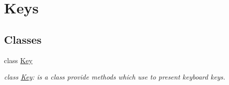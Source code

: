 \hypertarget{group__group12}{
\section{Keys}
\label{group__group12}
}
\subsection*{Classes}
\begin{DoxyCompactItemize}
\item 
class \hyperlink{class_key}{Key}
\begin{DoxyCompactList}\small\item\em class \hyperlink{class_key}{Key}: is a class provide methods which use to present keyboard keys. \end{DoxyCompactList}\end{DoxyCompactItemize}
